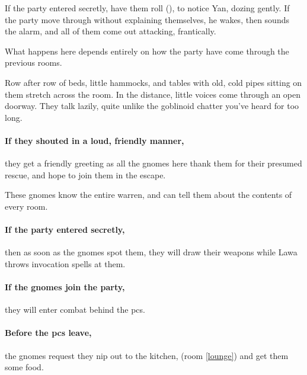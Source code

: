 \begin{multicols}{2}


If the party entered secretly, have them roll  (\tn[8]), to notice Yan, dozing gently.
If the party move through without explaining themselves, he wakes, then sounds the alarm, and all of them come out attacking, frantically.


What happens here depends entirely on how the party have come through the previous rooms.

\begin{boxtext}
  Row after row of beds, little hammocks, and tables with old, cold pipes sitting on them stretch across the room.
  In the distance, little voices come through an open doorway.
  They talk lazily, quite unlike the goblinoid chatter you've heard for too long.
\end{boxtext}

\paragraph{If they shouted in a loud, friendly manner,}
they get a friendly greeting as all the gnomes here thank them for their presumed rescue, and hope to join them in the escape.

These gnomes know the entire \gls{warren}, and can tell them about the contents of every room.

\paragraph{If the party entered secretly,}
then as soon as the gnomes spot them, they will draw their weapons while Lawa throws invocation spells at them.

\paragraph{If the gnomes join the party,}
they will enter combat behind the \glspl{pc}.

\paragraph{Before the \glspl{pc} leave,}
the gnomes request they nip out to the kitchen, (room \vref{lounge}) and get them some food.


\end{multicols}
